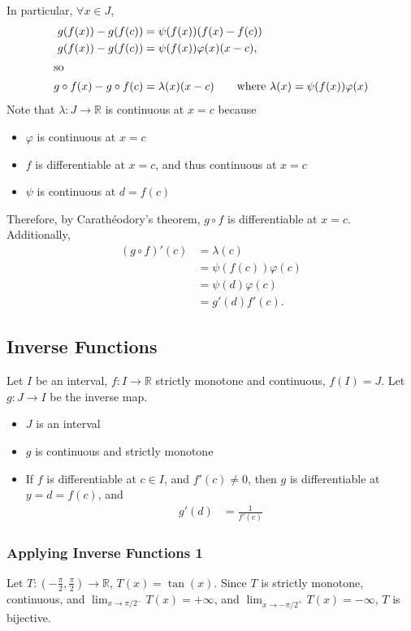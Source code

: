 \documentclass[10pt]{extarticle}
\newcommand{\R}{\mathbb{R}}
\begin{document}
    In particular, $\forall x\in J$,
    \begin{align*}
      g(f(x)) - g(f(c)) &= \psi(f(x))(f(x) - f(c))\\
      g(f(x)) - g(f(c)) &= \psi(f(x))\varphi(x)(x-c),\\
      \shortintertext{so}
      g\circ f(x) - g\circ f(c) &= \lambda(x)(x-c) \tag*{where $\lambda(x) = \psi(f(x))\varphi(x)$}
    \end{align*}
    Note that $\lambda: J\rightarrow \R$ is continuous at $x=c$ because
    \begin{itemize}
      \item $\varphi$ is continuous at $x=c$
      \item $f$ is differentiable at $x=c$, and thus continuous at $x=c$
      \item $\psi$ is continuous at $d = f(c)$
    \end{itemize}
    Therefore, by Carathéodory's theorem, $g\circ f$ is differentiable at $x=c$.\\

    Additionally,
    \begin{align*}
      \left(g\circ f\right)'(c) &= \lambda(c)\\
                                &= \psi(f(c))\varphi(c)\\
                                &= \psi(d)\varphi(c)\\
                                &= g'(d)f'(c).
    \end{align*}
  \subsection{Inverse Functions}%
    Let $I$ be an interval, $f: I\rightarrow \R$ strictly monotone and continuous, $f(I) = J$. Let $g: J\rightarrow I$ be the inverse map.
    \begin{itemize}
      \item $J$ is an interval
      \item $g$ is continuous and strictly monotone
      \item If $f$ is differentiable at $c\in I$, and $f'(c) \neq 0$, then $g$ is differentiable at $y = d = f(c)$, and
        \begin{align*}
          g'(d) &= \frac{1}{f'(c)}
        \end{align*}
    \end{itemize}
    \subsubsection{Applying Inverse Functions 1}%
    Let $T: \left(-\frac{\pi}{2},\frac{\pi}{2}\right)\rightarrow \R$, $T(x) = \tan(x)$. Since $T$ is strictly monotone, continuous, and $\lim_{x\rightarrow \pi/2^{-}}T(x) = +\infty$, and $\lim_{x\rightarrow -\pi/2^{+}}T(x) = -\infty$, $T$ is bijective.\\
\end{document}
